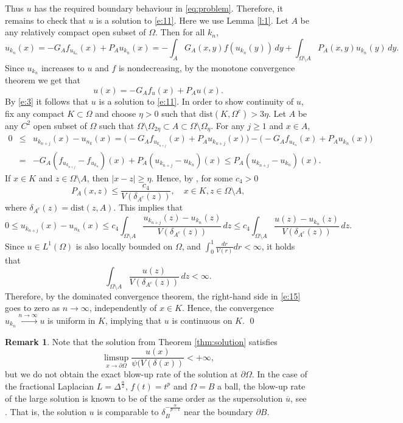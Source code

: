\documentclass[a4paper,12pt,draft]{article}
\theoremstyle{plain}
\theoremstyle{definition}
\newtheorem{remark}[thm]{Remark}
\numberwithin{equation}{section}
\renewcommand{\le}{\leqslant}
\renewcommand{\ge}{\geqslant}
\newcommand{\1}{1}
\begin{document}
Thus $u$ has the required boundary behaviour in \eqref{eq:problem}. Therefore, it remains to check that $u$ is a solution to \eqref{e:11}. Here we use Lemma \ref{l:1}. Let $A$ be any relatively compact open subset of $\Omega$. Then for all $k_n$,
$$
u_{k_n}(x)=-G_A f_{u_{k_n}}(x)+P_A u_{k_n}(x)= -\int_A G_A(x,y)f(u_{k_n}(y))\, dy +\int_{\Omega\setminus A}P_A(x,y)u_{k_n}(y)\, dy.
$$
Since $u_{k_n}$ increases to $u$ and $f$ is nondecreasing, by the monotone convergence theorem we get that
$$
u(x)=-G_A f_u(x)+P_A u(x). 
$$
By \eqref{e:3} it follows that $u$ is a solution to \eqref{e:11}. 
In order to show continuity of $u$, fix any compact $K\subset \Omega$ and choose $\eta>0$ such that $\mathrm{dist}(K, \Omega^c)> 3\eta$. Let $A$ be any $C^{2}$ open subset of $\Omega$ such that $\Omega\setminus \Omega_{2\eta}\subset A \subset \Omega\setminus \Omega_{\eta}$. For any $j\ge 1$ and $x\in A$,
\begin{eqnarray*}
0&\le & u_{k_{n+j}}(x)-u_{n_k}(x)=\big(-G_A f_{u_{k_{n+j}}}(x)+P_A u_{k_{n+j}}(x)\big)-\big(-G_A f_{u_{k_{n}}}(x)+P_A u_{k_{n}}(x)\big)\\
&=&-G_A ( f_{u_{k_{n+j}}}- f_{u_{k_{n}}})(x)+P_A ( u_{k_{n+j}}- u_{k_{n}})(x)\le P_A ( u_{k_{n+j}}- u_{k_{n}})(x).
\end{eqnarray*}
If $x\in K$ and $z\in \Omega\setminus A$, then $|x-z|\ge \eta$. Hence, by \cite[(4.5)]{BVW}, for some $c_4>0$
$$
P_A(x,z)\le \frac{c_4}{V(\delta_{A^c}(z))}, \quad x\in K, z\in \Omega\setminus A,
$$
where $\delta_{A^c}(z)=\text{dist}(z,A)$. This implies that
\begin{equation}\label{e:15}
0\le  u_{k_{n+j}}(x)-u_{n_k}(x)\le c_4\int_{\Omega\setminus  A}\frac{u_{k_{n+j}}(z)- u_{k_{n}}(z)}{V(\delta_{A^c}(z))}\, dz 
\le c_4\int_{\Omega\setminus  A}\frac{u(z)- u_{k_{n}}(z)}{V(\delta_{A^c}(z))}\, dz.
\end{equation}
Since $u\in L^1(\Omega)$ is also locally bounded on $\Omega$, and $\int_0^1 \frac{dr}{V(r)}dr<\infty$, it holds that 
\[
\int_{\Omega\setminus A}\frac{u(z)}{V(\delta_{A^c}(z))}\, dz <\infty.
\]
Therefore, by the dominated convergence theorem, the right-hand side in \eqref{e:15} goes to zero as $n\to \infty$, independently of $x\in K$. Hence, the convergence $u_{k_n}\xrightarrow{n\to\infty} u$ is uniform in $K$, implying that $u$ is continuous on $K$. 
\qed

\begin{remark}
    Note that the solution from Theorem \ref{thm:solution} satisfies
    \[
    \limsup\limits_{x\to\partial\Omega}\frac{u(x)}{\psi(V(\delta(x))}<+\infty,
    \]
    but we do not obtain the exact blow-up rate of the solution at $\partial\Omega$.  In the case of the fractional Laplacian $L=\Delta^{\frac \alpha 2}$, $f(t)=t^p$ and $\Omega=B$ a ball, the blow-up rate of the large solution is known to be of the same order as the supersolution $\overline{u}$, see \cite[Theorem 5.1]{benchrouda}. That is, the solution $u$ is comparable to $\delta_B^{-\frac{\alpha}{p-1}}$ near the boundary $\partial B$. 
\end{remark}
\end{document}
